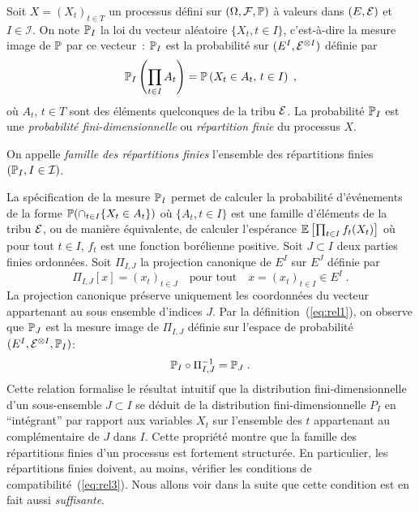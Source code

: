 Soit $X=(X_t)_{t \in T}$ un processus d\'efini sur  $(\Omega,\mathcal{F},\mathbb{P})$ \`a
valeurs dans $(E,\mathcal{E})$  et $I\in\mathcal{I}$.
On note $\mathbb{P}_I$ la loi du vecteur al\'eatoire $\{ X_{t}, {t\in I} \}$, c'est-\`a-dire la mesure image  de $\mathbb{P}$ par ce vecteur~: $\mathbb{P}_I$ est
la probabilit\'e sur $(E^{I},\mathcal{E}^{\otimes I})$ d\'efinie par
\begin{equation}
\label{eq:rel1}
\mathbb{P}_I\left(\prod_{t\in I}A_t\right)
 = \mathbb{P}\left(X_{t} \in A_t,\,t\in I\right) \;,
\end{equation}
o\`u $A_t$, $t\in T$ sont des \'el\'ements quelconques de la tribu $\mathcal{E}$. La probabilit\'e $\mathbb{P}_I$ est
une \emph{probabilit\'e fini-dimensionnelle} ou \emph{r\'epartition finie} du processus $X$.
\begin{definition}
On appelle \emph{famille des r\'epartitions finies} l'ensemble des
r\'epartitions finies $(\mathbb{P}_I, I \in \mathcal{I})$.
\end{definition}
La sp\'ecification de la mesure $\mathbb{P}_I$ permet de calculer la
probabilit\'e d'\'ev\'enements de la forme $\mathbb{P}( \cap_{t \in I} \{
X_t \in A_t \})$ o\`u $\{A_t, t \in I\}$ est une famille d'\'el\'ements de la
tribu $\mathcal{E}$, ou de mani\`ere \'equivalente, de calculer l'esp\'erance
${\mathbb E}\left[ \prod_{t \in I} f_t(X_t)  \right]$ o\`u pour tout $t\in I$, $f_t$ est une
fonction bor\'elienne positive. Soit
$J \subset I$ deux parties finies ordonn\'ees. Soit $\Pi_{I,J}$ la
projection canonique de $E^{I}$ sur $E^{J}$ d\'efinie par
\begin{equation}
\label{eq:rel2} \Pi_{I,J}[ x ] = (x_t)_{t \in J}\quad \text{pour tout}\quad x=(x_t)_{t \in I} \in E^I\;.
\end{equation}
La projection canonique pr\'eserve uniquement les coordonn\'ees du
vecteur appartenant au sous ensemble d'indices $J$.
Par la d\'efinition~(\ref{eq:rel1}), on observe que $\mathbb{P}_J$ est la mesure image de $\Pi_{I,J}$ d\'efinie sur
l'espace de probabilit\'e $(E^{I},\mathcal{E}^{\otimes I},\mathbb{P}_I)$:
\begin{equation}
\label{eq:rel3} \mathbb{P}_I \circ \Pi_{I,J}^{-1} = \mathbb{P}_J \;.
\end{equation}
Cette relation
formalise le r\'esultat intuitif que la distribution
fini-dimensionnelle d'un sous-ensemble $J \subset I$ se d\'eduit de
la distribution fini-dimensionnelle $P_I$ en ``int\'egrant'' par rapport aux
variables $X_{t}$ sur l'ensemble des $t$ appartenant au
compl\'ementaire de $J$ dans $I$. Cette propri\'et\'e montre que la
famille des r\'epartitions finies d'un processus est fortement
structur\'ee. En particulier, les r\'epartitions finies doivent, au
moins, v\'erifier les conditions de compatibilit\'e~(\ref{eq:rel3}).
Nous allons voir dans la suite que cette condition est en fait
aussi {\em suffisante}.


